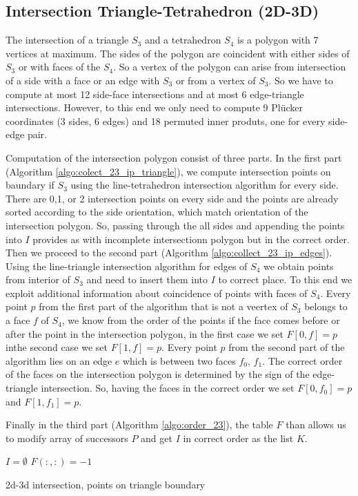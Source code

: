 \documentclass{elsarticle}
\newcommand{\plucker}{Pl\"{u}cker }
\begin{document}
\subsection{Intersection Triangle-Tetrahedron (2D-3D)}
The intersection of a triangle $S_3$ and a tetrahedron $S_4$ is a polygon with 7 vertices at maximum. The sides of the polygon
are coincident with either sides of $S_3$ or with faces of the $S_4$. So a vertex of the polygon
can arise from intersection of a side with a face or an edge with $S_3$ or from a vertex of $S_3$.
So we have to compute at most 12 side-face intersections and at most 6 edge-triangle intersections. However,
to this end we only need to compute 9 \plucker coordinates (3 sides, 6 edges) and 18 permuted inner produts, one for every side-edge pair.

Computation of the intersection polygon consist of three parts. In the first part (Algorithm \ref{algo:colect_23_ip_triangle}), we compute intersection points
on baundary if $S_3$ using the line-tetrahedron intersection algorithm for every side. There are 0,1, or 2 intersection points
on every side and the points are already sorted according to the side orientation, which match orientation of the intersection polygon. So, passing
through the all sides and appending the points into $I$ provides as with incomplete intersectionn polygon but in the correct order.
Then we proceed to the second part (Algorithm \ref{algo:collect_23_ip_edges}). Using the line-triangle intersection algorithm for edges of $S_4$
we obtain points from interior of $S_3$ and need to insert them into $I$ to correct place. To this end we exploit additional information about coincidence of points
with faces of $S_4$. Every point $p$ from the first part of the algorithm that is not a veertex of $S_3$ belongs to a face $f$ of $S_4$, we know from the order of the points
if the face comes before or after the point in the intersection polygon, in the first case we set $F[0,f] =p$ inthe second case we set $F[1,f]=p$. 
Every point $p$ from the second part of the algorithm lies on an edge $e$ which is between two faces $f_0$, $f_1$. The correct order of the faces on the 
intersection polygon is determined by the sign of the edge-triangle intersection. So, having the faces in the correct order we set $F[0,f_0]=p$ and $F[1, f_1]=p$.

Finally in the third part (Algorithm \ref{algo:order_23}), the table $F$ than allows us to modify array of successors $P$ and get $I$ in correct order as the list $K$.


\begin{algorithm}
  \DontPrintSemicolon
  $I =\emptyset$
  $F(:,:)=-1$
  \caption{2d-3d intersection, points on triangle boundary}
  \label{algo:colect_23_ip_triangle}
\end{algorithm}
\end{document}
